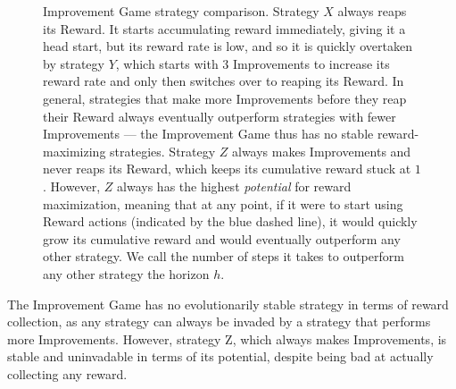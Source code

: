 \begin{figure}[!ht]
  \centering
  \caption{ Improvement Game strategy comparison. Strategy $X$ always
    reaps its Reward. It starts accumulating reward immediately, giving it a head start, but its
    reward rate is low, and so it is quickly overtaken by strategy $Y$, which
    starts with 3 Improvements to increase its reward rate and only then
    switches over to reaping its Reward. In general, strategies that make more
    Improvements before they reap their Reward always eventually outperform strategies
    with fewer Improvements --- the Improvement Game thus has no stable
    reward-maximizing strategies. Strategy $Z$ always makes Improvements and
    never reaps its Reward, which keeps its cumulative reward stuck at $1$. However, $Z$
    always has the highest \emph{potential} for reward maximization, meaning
    that at any point, if it were to start using Reward actions (indicated
    by the blue dashed line), it would quickly grow its cumulative reward and
    would eventually outperform any other strategy. We call the number of steps
    it takes to outperform any other strategy the horizon $h$. }
  \label{fig:growth}
\end{figure}

The Improvement Game has no evolutionarily stable strategy in terms of reward
collection, as any strategy can always be invaded by a strategy that performs more
Improvements. However, strategy Z, which always makes Improvements, is stable
and uninvadable in terms of its potential, despite being bad at actually
collecting any reward.


